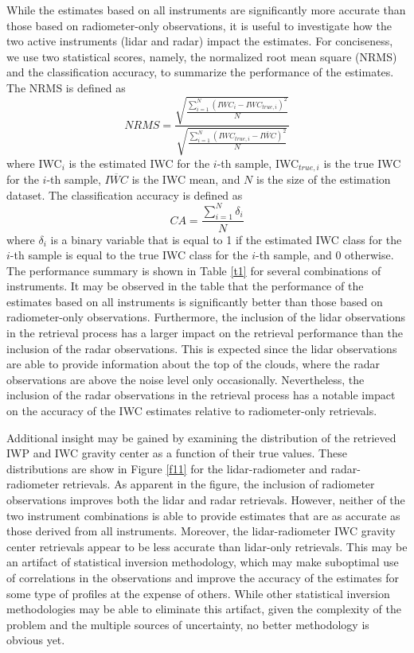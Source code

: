 \documentclass{ametsocV6.1}
\begin{document}
While the estimates based on all instruments are significantly more accurate than those based on radiometer-only observations, it is useful to investigate how the two active instruments (lidar and radar) impact the estimates.  For conciseness, we use two statistical scores, namely, the normalized root mean square (NRMS) and the classification accuracy, to summarize the performance of the estimates.  The NRMS is defined as
\begin{equation}
NRMS=\frac {\sqrt {\frac {\sum_{i=1}^{N} (IWC_{i}-IWC_{true,i})^2} {N}}} {\sqrt {\frac {\sum_{i=1}^{N} (IWC_{true,i}-\overline{IWC})^2} {N}}} 
\end{equation}
where IWC$_{i}$ is the estimated IWC for the $i$-th sample, IWC$_{true,i}$ is the true IWC for the $i$-th sample,
$\overline{IWC}$ is the IWC mean, and $N$ is the size of the estimation dataset.  The classification
accuracy is defined as
\begin{equation}
CA=\frac {\sum_{i=1}^{N} \delta_{i}} {N}
\end{equation}
where $\delta_{i}$ is a binary variable that is equal to 1 if the estimated IWC class for the $i$-th sample is equal to the true IWC class for the $i$-th sample, and 0 otherwise. The performance summary is shown in Table \ref{t1} for several combinations of instruments. It may be observed in the table that the performance of the estimates based on all instruments is significantly better than those based on radiometer-only observations.  Furthermore, the inclusion of the lidar observations in the retrieval process has a larger impact on the retrieval performance than the inclusion of the radar observations.  This is expected since the lidar observations are able to provide information about the top of the clouds, where the radar observations are above the noise level only occasionally. Nevertheless, the inclusion of the radar observations in the retrieval process has a notable impact on the accuracy of the IWC estimates relative to radiometer-only retrievals. 

Additional insight may be gained by examining the distribution of the retrieved IWP and IWC gravity center as a function of their true values.  These distributions are show in Figure \ref{f11} for the lidar-radiometer and radar-radiometer retrievals.  As apparent in the figure, the inclusion of radiometer observations improves both the lidar and radar retrievals. However, neither of the two instrument combinations is able to provide estimates that are as accurate as those derived from all instruments.  Moreover, the lidar-radiometer IWC gravity center retrievals appear to be less accurate than lidar-only retrievals. This may be an artifact of statistical inversion methodology, which may make suboptimal use of correlations in the observations and improve the accuracy of the estimates for some type of profiles at the expense of others.  While other statistical inversion methodologies may be able to eliminate this artifact, given the complexity of the problem and the multiple sources of uncertainty, no better methodology is
obvious yet.
\end{document}
